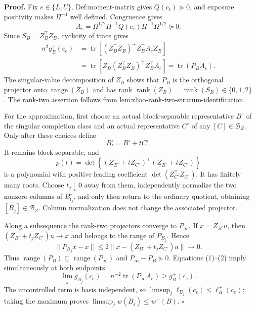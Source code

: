 \textbf{Proof.}
Fix \(e\in\{L,U\}\).  Def:moment-matrix gives \(Q(c_e)\succeq0\), and exposure positivity makes \(\Pi^{-1}\) well defined.  Congruence gives
\[
 A_e=\Omega^{1/2}\Pi^{-1}Q(c_e)\Pi^{-1}\Omega^{1/2}\succeq0. \tag{1}
\]
Since \(S_B=Z_B^{\top}Z_B\), cyclicity of trace gives
\[
 \begin{aligned}
 n^2g_B^+(c_e)
 &=\operatorname{tr}\!\left[(Z_B^{\top}Z_B)^+Z_B^{\top}A_eZ_B\right]\\
 &=\operatorname{tr}\!\left[Z_B(Z_B^{\top}Z_B)^+Z_B^{\top}A_e\right]
 =\operatorname{tr}(P_BA_e).
 \end{aligned} \tag{2}
\]
The singular-value decomposition of \(Z_B\) shows that \(P_B\) is the orthogonal projector onto \(\operatorname{range}(Z_B)\) and has rank \(\operatorname{rank}(Z_B)=\operatorname{rank}(S_B)\in\{0,1,2\}\).  The rank-two assertion follows from lem:zhao-rank-two-stratum-identification.

For the approximation, first choose an actual block-separable representative \(B^\circ\) of the singular completion class and an actual representative \(C^\circ\) of any \([C]\in\mathcal B_Z\).  Only after these choices define
\[
 B_t^\circ=B^\circ+tC^\circ.
\]
It remains block separable, and
\[
 p(t)=\det\!\left\{(Z_{B^\circ}+tZ_{C^\circ})^{\top}(Z_{B^\circ}+tZ_{C^\circ})\right\}
\]
is a polynomial with positive leading coefficient \(\det(Z_{C^\circ}^{\top}Z_{C^\circ})\).  It has finitely many roots.  Choose \(t_j\downarrow0\) away from them, independently normalize the two nonzero columns of \(B_{t_j}^\circ\), and only then return to the ordinary quotient, obtaining \([B_j]\in\mathcal B_Z\).  Column normalization does not change the associated projector.

Along a subsequence the rank-two projectors converge to \(P_\infty\).  If \(x=Z_{B^\circ}u\), then \((Z_{B^\circ}+t_jZ_{C^\circ})u\to x\) and belongs to the range of \(P_{B_j}\).  Hence
\[
 \lVert P_{B_j}x-x\rVert
 \le2\lVert x-(Z_{B^\circ}+t_jZ_{C^\circ})u\rVert\to0.
\]
Thus \(\operatorname{range}(P_B)\subseteq\operatorname{range}(P_\infty)\) and \(P_\infty-P_B\succeq0\).  Equations (1)--(2) imply simultaneously at both endpoints
\[
 \lim_jg_{B_j}(c_e)=n^{-2}\operatorname{tr}(P_\infty A_e)
 \ge g_B^+(c_e).
\]
The uncontrolled term is basis independent, so \(\limsup_j\ell_{B_j}(c_e)\le\ell_B^+(c_e)\); taking the maximum proves \(\limsup_jw(B_j)\le w^+(B)\). \(\square\)